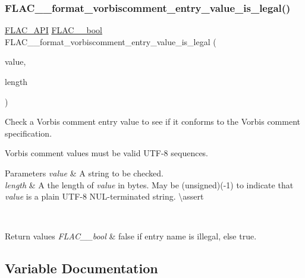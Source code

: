 \subsubsection{\texorpdfstring{FLAC\_\_format\_vorbiscomment\_entry\_value\_is\_legal()}{FLAC\_\_format\_vorbiscomment\_entry\_value\_is\_legal()}}
{\footnotesize\ttfamily \mbox{\hyperlink{group__flac__export_ga56ca07df8a23310707732b1c0007d6f5}{F\+L\+A\+C\+\_\+\+A\+PI}} \mbox{\hyperlink{ordinals_8h_a95103469f1cbd78b8cf250194985b34e}{F\+L\+A\+C\+\_\+\+\_\+bool}} F\+L\+A\+C\+\_\+\+\_\+format\+\_\+vorbiscomment\+\_\+entry\+\_\+value\+\_\+is\+\_\+legal (\begin{DoxyParamCaption}\item[{const \mbox{\hyperlink{ordinals_8h_a5eb569b12d5b047cdacada4d57924ee3}{F\+L\+A\+C\+\_\+\+\_\+byte}} $\ast$}]{value,  }\item[{unsigned}]{length }\end{DoxyParamCaption})}

Check a Vorbis comment entry value to see if it conforms to the Vorbis comment specification.

Vorbis comment values must be valid U\+T\+F-\/8 sequences.


\begin{DoxyParams}{Parameters}
{\em value} & A string to be checked. \\
\hline
{\em length} & A the length of {\itshape value} in bytes. May be {\ttfamily }(unsigned)(-\/1) to indicate that {\itshape value} is a plain U\+T\+F-\/8 N\+U\+L-\/terminated string. \textbackslash{}assert 
\begin{DoxyCode}{1}
\end{DoxyCode}
 \\
\hline
\end{DoxyParams}

\begin{DoxyRetVals}{Return values}
{\em F\+L\+A\+C\+\_\+\+\_\+bool} & {\ttfamily false} if entry name is illegal, else {\ttfamily true}. \\
\hline
\end{DoxyRetVals}


\subsection{Variable Documentation}
\mbox{\label{group__flac__format_ga56e0484fe205ab9f699ba5413c8441a1}} 
